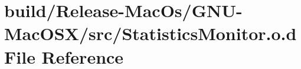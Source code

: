 \hypertarget{_release-_mac_os_2_g_n_u-_mac_o_s_x_2src_2_statistics_monitor_8o_8d}{}\section{build/\+Release-\/\+Mac\+Os/\+G\+N\+U-\/\+Mac\+O\+S\+X/src/\+Statistics\+Monitor.o.\+d File Reference}
\label{_release-_mac_os_2_g_n_u-_mac_o_s_x_2src_2_statistics_monitor_8o_8d}
